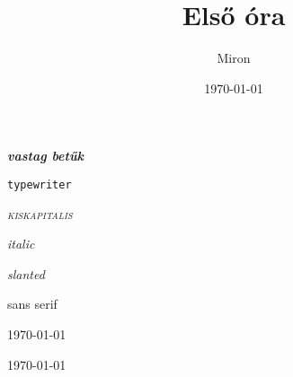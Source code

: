 \documentclass{article}
\title{Első óra}
\author{Miron}
\date{\today}
\begin{document}
\maketitle


\textbf{\emph{vastag betűk}} 

\texttt{typewriter}

\textsc{\emph{kiskapitalis}} 

\textit{\emph{italic}}

\textsl{slanted} 


\textsf{sans serif}








\textcolor{red}{}

\begin{otherlanguage}{hungarian}
\today

\frenchspacing{\textcolor{blue}{\hulipsum[1]}}
\end{otherlanguage}

\par
\begin{otherlanguage}{latin}
\begin{flushright}

\lipsum[1]

\end{flushright}
\end{otherlanguage}

\begin{otherlanguage}{english}
\today

\linespread{1.6}{\blindtext[1]}
\end{otherlanguage}
\end{document}
